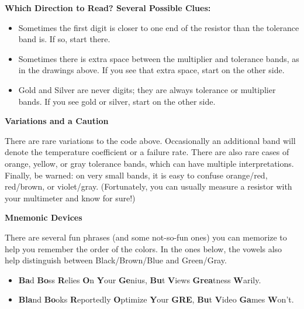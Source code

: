 \medskip
\textbf{Which Direction to Read? Several Possible Clues:}
\begin{itemize}[nosep]
\item Sometimes the first digit is closer to one end of the resistor than the tolerance band is.  If so, start there.
\item Sometimes there is extra space between the multiplier and tolerance bands, as in the drawings above.  If you see that extra space, start on the other side.
\item Gold and Silver are never digits; they are always tolerance or multiplier bands.  If you see gold or silver, start on the other side.
\end{itemize}

\medskip
\textbf{Variations and a Caution}

There are rare variations to the code above.  Occasionally an additional band will denote the temperature coefficient or a failure rate.  There are also rare cases of orange, yellow, or gray tolerance bands, which can have multiple interpretations.  Finally, be warned: on very small bands, it is easy to confuse orange/red, red/brown, or violet/gray.  (Fortunately, you can usually measure a resistor with your multimeter and know for sure!)

\medskip
\textbf{Mnemonic Devices}

There are several fun phrases (and some not-so-fun ones) you can memorize to help you remember the order of the colors.   In the ones below, the vowels also help distinguish between Black/Brown/Blue and Green/Gray.
\begin{itemize}[nosep]
\item \textbf{Ba}d \textbf{Bo}ss \textbf{R}elies \textbf{O}n \textbf{Y}our \textbf{Ge}nius, \textbf{Bu}t \textbf{V}iews \textbf{Grea}tness \textbf{W}arily.
\item \textbf{Bla}nd \textbf{Bo}oks \textbf{R}eportedly \textbf{O}ptimize \textbf{Y}our \textbf{GRE}, \textbf{Bu}t \textbf{V}ideo \textbf{Ga}mes \textbf{W}on't.
\end{itemize}

